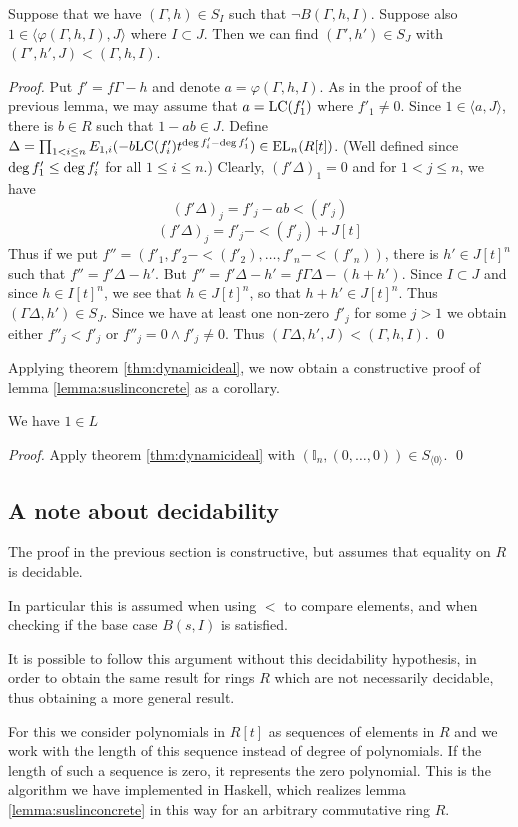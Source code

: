 \begin{lemma}[2b]
  Suppose that we have $(\Gamma,h) \in S_I$ such that $\neg B(\Gamma,h, I)$.
  Suppose also $1 \in \langle  \varphi(\Gamma,h,I), J \rangle$ where $I \subset J$.
  Then we can find $(\Gamma',h') \in S_J$ with $(\Gamma',h',J) < (\Gamma, h, I)$.
\end{lemma}
\begin{proof}
  Put $f' = f \Gamma - h$ and denote $a = \varphi(\Gamma,h,I)$.
  As in the proof of the previous lemma, we may assume that $a = \text{LC} (f'_1)$ where $f'_1 \neq 0$.
  Since $1 \in \langle a,J \rangle$, there is $b \in R$ such that $1-ab \in J$.
  Define $\Delta = \prod_{1 < i \leq n} E_{1, i}(-b\text{LC}(f'_i)t^{\deg f'_i - \deg f'_1}) \in \text{EL}_n(R[t])$.
  (Well defined since $\deg f'_1 \leq \deg f'_i$ for all $1\leq i \leq n$.)
  Clearly, $(f'\Delta)_1 = 0$ and for $1 < j \leq n$, we have
  \[
  (f'\Delta)_j = f'_j - ab \lt(f'_j)
  \]\[
  (f'\Delta)_j = f'_j - \lt(f'_j) + J[t]
  \]
  Thus if we put $f'' = (f'_1, f'_2 - \lt(f'_2), \dots, f'_n - \lt(f'_n))$, there is $h' \in J[t]^n$ such that
  $f'' = f'\Delta - h'$.
  But $f'' = f' \Delta - h' = f\Gamma\Delta - (h + h')$.
  Since $I \subset J$ and since $h \in I[t]^n$, we see that $h \in J[t]^n$, so that $h + h' \in J[t]^n$.
  Thus $(\Gamma\Delta, h') \in S_J$.
  Since we have at least one non-zero $f'_j$ for some $j > 1$ we obtain either $f''_j < f'_j$ or $f''_j = 0 \wedge f'_j \neq 0$.
  Thus $(\Gamma\Delta, h', J) < (\Gamma,h,I)$. 
  \qed
\end{proof}

Applying theorem \ref{thm:dynamicideal}, we now obtain a constructive proof of lemma \ref{lemma:suslinconcrete} as a corollary.

\begin{corollary}
  We have $1 \in L$
\end{corollary}
\begin{proof}
  Apply theorem \ref{thm:dynamicideal} with $(\mathbb{I}_n, (0, \dots, 0)) \in S_{\langle 0 \rangle}$.
  \qed
\end{proof}

\subsection{A note about decidability}

The proof in the previous section is constructive, but assumes that equality on $R$ is decidable.

In particular this is assumed when using $<$ to compare elements, and when checking if the base case $B(s,I)$ is satisfied.

It is possible to follow this argument without this decidability hypothesis, in order to obtain the same result for rings $R$ which are not necessarily decidable, thus obtaining a more general result.

For this we consider polynomials in $R[t]$ as sequences of elements in $R$ and we work with the length of this sequence instead of degree of polynomials. If the length of such a sequence is zero, it represents the zero polynomial.
This is the algorithm we have implemented in Haskell, which realizes lemma \ref{lemma:suslinconcrete} in this way for an arbitrary commutative ring $R$.
